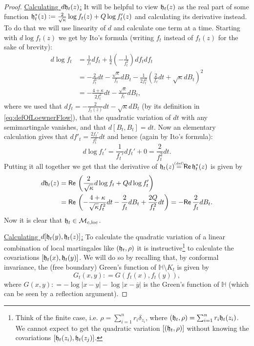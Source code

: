 \documentclass[11pt,reqno]{amsart}
\numberwithin{equation}{section}
\newcommand{\eqbydef}{\mathrel{\stackrel{\hspace*{-3mm}\text{\tiny(def)}\hspace*{-3mm}}{=}}}
\newcommand{\deq}{\mathrel{\mathop:}=}
\renewcommand{\Re}{\mathsf{Re}\,}
\newcommand{\fh}{{\frak h}}
\begin{document}
\begin{proof}
	\underline{Calculating $d\fh_t(z)$:} It will be helpful to view $\fh_t(z)$ as the real part of some function $\fh_t^*(z)\deq \frac{2}{\sqrt\kappa}\log f_t(z)+Q\log f_t'(z)$ and calculating its derivative instead. To do that we will use linearity of $d$ and calculate one term at a time. Starting with $d\log f_t(z)$ we get by Ito's formula (writing $f_t$ instead of $f_t(z)$ for the sake of brevity):
	\begin{align*}
		d\log f_t &=\frac{1}{f_t}df_t+\frac{1}{2}\left(-\frac{1}{f_t^2}\right)df_tdf_t\\
		&=-\frac{2}{f_t^2}dt-\frac{\sqrt\kappa}{f_t}dB_t-\frac{1}{2f_t^2}\left(\frac{2}{f_t}dt+\sqrt\kappa dB_t\right)^2\\
		&=-\frac{4+\kappa}{2f_t^2}dt-\frac{\sqrt\kappa}{f_t}dB_t,
	\end{align*}
	where we used that $df_t=-\frac{2}{f_t(z)}dt-\sqrt\kappa dB_t$ (by its definition in \eqref{eq:defOfLoewnerFlow}), that the quadratic variation of $dt$ with any semimartingale vanishes, and that $d[B_t,B_t]=dt$.
	Now an elementary calculation gives that $df'_t=\frac{2f_t'}{f_t^2}dt$ and hence (again by Ito's formula):
	$$d\log f_t'=\frac{1}{f_t'}df_t'+0=\frac{2}{f_t^2}dt.$$
	Putting it all together we get that the derivative of $\fh_t(z)\eqbydef\Re\fh_t^*(z)$ is given by 
	\begin{align*}
		d\fh_t(z)&=\Re\left(\frac{2}{\sqrt\kappa}d\log f_t+Qd\log f_t' \right)\\
		&=\Re\left(-\frac{4+\kappa}{\sqrt\kappa f_t^2}dt-\frac{2}{f_t}dB_t+\frac{2Q}{f_t^2}dt\right)=-\Re\frac{2}{f_t}dB_t.
	\end{align*}
	Now it is clear that $\fh_t\in\mathcal M_{c,\text{loc}}$.
	
	\underline{Calculating $d[\fh_t(y),\fh_t(z)]$:} To calculate the quadratic variation of a linear combination of local martingales like $(\fh_t,\rho)$ it is instructive\footnote{Think of the finite case, i.e. $\rho = \sum_{i=1}^n r_i\delta_{z_i}$, where $(\fh_t,\rho) = \sum_{i=1}^n r_i\fh_t(z_i)$. We cannot expect to get the quadratic variation $[(\fh_t,\rho)]$ without knowing the covariations $[\fh_t(z_i),\fh_t(z_j)]$.} to calculate the covariations $[\fh_t(x),\fh_t(y)]$. We will do so by recalling that, by conformal invariance, the (free boundary) Green's function of $\mathbb H\setminus K_t$ is given by $$G_t(x,y)\deq G(f_t(x),f_t(y)),$$
	where $G(x,y)\deq -\log|x-y|-\log|x-\overline y|$ is the Green's function of $\mathbb H$ (which can be seen by a reflection argument).
	

\end{proof}
\end{document}
